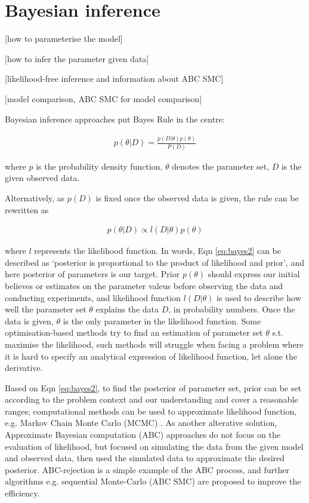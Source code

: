 \section{Bayesian inference}

 [how to parameterise the model]

 [how to infer the parameter given data]

 [likelihood-free inference and information about ABC SMC]

 [model comparison, ABC SMC for model comparison]

 Bayesian inference approaches put Bayes Rule in the centre:

 \begin{align}
    \label{eq:bayes}
    p(\theta|D) = \frac{p(D|\theta)p(\theta)}{P(D)}
\end{align}

where $p$ is the probability density function, $\theta$ denotes the parameter set, $D$ is the given observed data.

Alternatively, as $p(D)$ is fixed once the observed data is given, the rule can be rewritten as 

\begin{align}
    \label{eq:bayes2}
    p(\theta|D) \propto l(D|\theta)p(\theta)
\end{align}

where $l$ represents the likelihood function. In words, Eqn \ref{eq:bayes2} can be described as `posterior is proportional to the product of likelihood and prior', and here posterior of parameters is our target. Prior $p(\theta)$ should express our initial believes or estimates on the parameter valeus before observing the data and conducting experiments, and likelihood function $l(D|\theta)$ is used to describe how well the parameter set $\theta$ explains the data $D$, in probability numbers. Once the data is given, $\theta$ is the only parameter in the likelihood function. Some optimisation-based methods try to find an estimation of parameter set $\theta$ s.t. maximise the likelihood, such methods will struggle when facing a problem where it is hard to specify an analytical expression of likelihood function, let alone the derivative.

Based on Eqn \ref{eq:bayes2}, to find the posterior of parameter set, prior can be set according to the problem context and our understanding and cover a reasonable ranges; computational methods can be used to approximate likelihood function, e.g. Markov Chain Monte Carlo (MCMC) \cite{ref:MCMC}. As another alterative solution, Approximate Bayesian computation (ABC) approaches do not focus on the evaluation of likelihood, but focused on simulating the data from the given model and observed data, then used the simulated data to approximate the desired posterior. ABC-rejection \cite{ABC_rejection} is a simple example of the ABC process, and further algorithms e.g. sequential Monte-Carlo (ABC SMC)\cite{Toni} are proposed to improve the efficiency.

